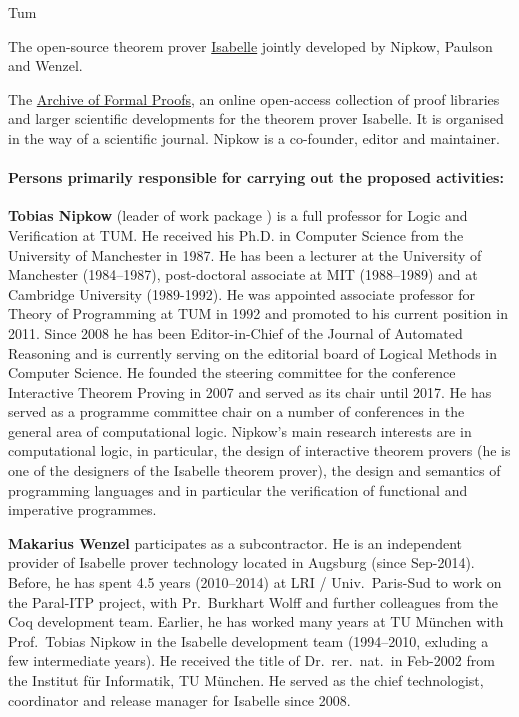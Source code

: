 \begin{sitedescription}{Tum}
\begin{compactitem}
\item The open-source theorem prover
  \href{https://isabelle.in.tum.de}{Isabelle} jointly developed by
  Nipkow, Paulson and Wenzel.
\item The \href{http://www.isa-afp.org}{Archive of Formal Proofs}, an online
open-access collection of proof libraries and larger scientific
developments for the theorem prover Isabelle. It is organised in the
way of a scientific journal.  Nipkow is a co-founder, editor and maintainer.
\end{compactitem}

\paragraph*{Persons primarily responsible for carrying out the proposed activities:}

\begin{compactitem}
\item \textbf{Tobias Nipkow} (leader of work package
) is a full professor for Logic and
Verification at TUM. He received his Ph.D. in Computer Science
from the University of Manchester in 1987.  He has been a
lecturer at the University of Manchester (1984--1987),
post-doctoral associate at MIT (1988--1989) and at Cambridge
University (1989-1992). He was appointed associate professor for Theory of Programming at
TUM in 1992 and promoted to his current position in 2011. Since 2008
he has been Editor-in-Chief of the  Journal of Automated Reasoning
and is currently serving on the editorial board of Logical Methods in
Computer Science. He founded the steering committee for the
conference Interactive Theorem Proving in 2007 and served as its
chair until 2017.
He has served as a programme committee chair
on a number of conferences in the general area of computational logic.  Nipkow's main research
interests are in computational logic, in particular, the design of
interactive theorem provers (he is one of the designers of the
Isabelle theorem prover), the design and semantics of programming
languages and in particular the verification of functional and
imperative programmes.

\item \textbf{Makarius Wenzel} participates as a subcontractor. He is an independent provider of Isabelle
  prover technology located in Augsburg (since Sep-2014). Before, he
  has spent 4.5 years (2010--2014) at LRI / Univ.\ Paris-Sud to work on
  the Paral-ITP project, with Pr.~Burkhart Wolff and further
  colleagues from the Coq development team. Earlier, he has worked
  many years at TU München with Prof.\ Tobias Nipkow in the Isabelle
  development team (1994--2010, exluding a few intermediate years). He
  received the title of Dr.~rer.~nat.\ in Feb-2002 from the Institut
  für Informatik, TU München. He served as the chief technologist,
  coordinator and release manager for Isabelle since 2008.
\end{compactitem}

\end{sitedescription}

